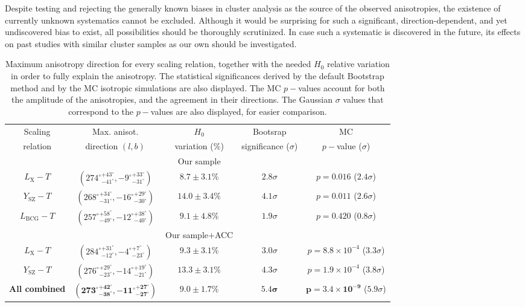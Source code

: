 \documentclass{aa}   %
\newcommand{\LT}{$L_{\text{X}}-T$}
\newcommand{\YT}{$Y_{\text{SZ}}-T$}
\newcommand{\LbcgT}{$L_{\text{BCG}}-T$}
\begin{document}
Despite testing and rejecting the generally known biases in cluster analysis as the source of the observed anisotropies, the existence of currently unknown systematics cannot be excluded. Although it would be surprising for such a significant, direction-dependent, and yet undiscovered bias to exist, all possibilities should be thoroughly scrutinized. In case such a systematic is discovered in the future, its effects on past studies with similar cluster samples as our own should be investigated.

\begin{table}[hbtp]
\caption{\small{Maximum anisotropy direction for every scaling relation, together with the needed $H_0$ relative variation in order to fully explain the anisotropy. The statistical significances derived by the default Bootstrap method and by the MC isotropic simulations are also displayed. The MC $p-$values account for both the amplitude of the anisotropies, and the agreement in their directions. The Gaussian $\sigma$ values that correspond to the $p-$values are also displayed, for easier comparison.}}
\label{summary_anisot}
\begin{center}
\renewcommand{\arraystretch}{1.3}
\small
\begin{tabular}{ c  c  c  c c}
\hline \hline

Scaling & Max. anisot. &  $H_0$  & Bootsrap & MC\\
relation & direction $(l,b)$  & variation ($\%$)  & significance ($\sigma$)& $p-$value ($\sigma$)  \\
\hline \hline
 & &  Our sample & & \\ \hline
\LT & $({274^{\circ}}^{+43^{\circ}}_{-41^{\circ}},{-9^{\circ}}^{+33^{\circ}}_{-31^{\circ}})$ & $8.7\pm 3.1\%$ & $2.8\sigma$ & $p=0.016$ ($2.4\sigma$)   \\ 
\YT & $({268^{\circ}}^{+34^{\circ}}_{-31^{\circ}},{-16^{\circ}}^{+29^{\circ}}_{-30^{\circ}})$ & $14.0\pm 3.4\%$ & $4.1\sigma$ & $p=0.011$ ($2.6\sigma$) \\ 
\LbcgT & $({257^{\circ}}^{+58^{\circ}}_{-49^{\circ}},{-12^{\circ}}^{+38^{\circ}}_{-40^{\circ}})$ & $9.1\pm 4.8\% $ & $1.9\sigma$ & $p=0.420$ ($0.8\sigma$) \\ 

\hline
& &  Our sample$+$ACC & &  \\ \hline
\LT & $({284^{\circ}}^{+31^{\circ}}_{-12^{\circ}},{-4^{\circ}}^{+7^{\circ}}_{-23^{\circ}})$ & $9.3\pm 3.1\% $ & $3.0\sigma$  & $p=8.8\times 10^{-4}$ ($3.3\sigma$)   \\ 
\YT & $({276^{\circ}}^{+29^{\circ}}_{-23^{\circ}},{-14^{\circ}}^{+19^{\circ}}_{-21^{\circ}})$ & $13.3\pm 3.1 \%$ & $4.3\sigma$ & $p=1.9\times 10^{-4}$ ($3.8\sigma$)\\ 
\hline
\textbf{All combined} & $\mathbf{({273^{\circ}}^{+42^{\circ}}_{-38^{\circ}},{-11^{\circ}}^{+27^{\circ}}_{-27^{\circ}})}$ & $\mathbf{9.0\pm 1.7\%}$ & $\mathbf{5.4\sigma}$ & $\mathbf{p=3.4\times 10^{-9}}$ ($5.9\sigma$) \\ 




\end{tabular}
\end{center}
\end{table}
\end{document}
